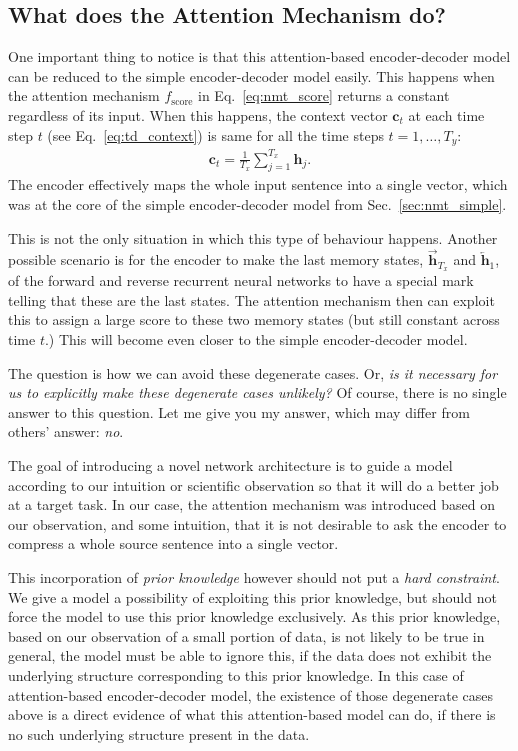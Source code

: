 \documentclass{report}
\newcommand{\vect}[1]{\mathbf{#1}}
\newcommand{\vc}[0]{\vect{c}}
\newcommand{\vh}[0]{\vect{h}}
\begin{document}
\subsection{What does the Attention Mechanism do?}

One important thing to notice is that this attention-based encoder-decoder model
can be reduced to the simple encoder-decoder model easily. This happens when the
attention mechanism $f_{\text{score}}$ in Eq.~\eqref{eq:nmt_score} returns a
constant regardless of its input. When this happens, the context vector $\vc_t$
at each time step $t$ (see Eq.~\eqref{eq:td_context}) is same for all the time
steps $t=1,\ldots,T_y$:
\begin{align*}
    \vc_t = \frac{1}{T_x} \sum_{j=1}^{T_x} \vh_j.
\end{align*}
The encoder effectively maps the whole input sentence into a single vector,
which was at the core of the simple encoder-decoder model from
Sec.~\ref{sec:nmt_simple}. 

This is not the only situation in which this type of behaviour happens. Another
possible scenario is for the encoder to make the last memory states,
$\overrightarrow{\vh}_{T_x}$ and $\overleftarrow{\vh}_1$, of the forward and
reverse recurrent neural networks to have a special mark telling that these are
the last states. The attention mechanism then can exploit this to assign a large
score to these two memory states (but still constant across time $t$.) This will
become even closer to the simple encoder-decoder model.

The question is how we can avoid these degenerate cases. Or, {\em is it
necessary for us to explicitly make these degenerate cases unlikely?} Of course,
there is no single answer to this question. Let me give you my answer, which may
differ from others' answer: {\em no}.

The goal of introducing a novel network architecture is to guide a model
according to our intuition or scientific observation so that it will do a better
job at a target task. In our case, the attention mechanism was introduced based
on our observation, and some intuition, that it is not desirable to ask the
encoder to compress a whole source sentence into a single vector. 

This incorporation of {\em prior knowledge} however should not put a {\em hard
constraint}. We give a model a possibility of exploiting this prior knowledge,
but should not force the model to use this prior knowledge exclusively. As this
prior knowledge, based on our observation of a small portion of data, is not
likely to be true in general, the model must be able to ignore this, if the data
does not exhibit the underlying structure corresponding to this prior knowledge.
In this case of attention-based encoder-decoder model, the existence of those
degenerate cases above is a direct evidence of what this attention-based model
can do, if there is no such underlying structure present in the data. 
\end{document}
